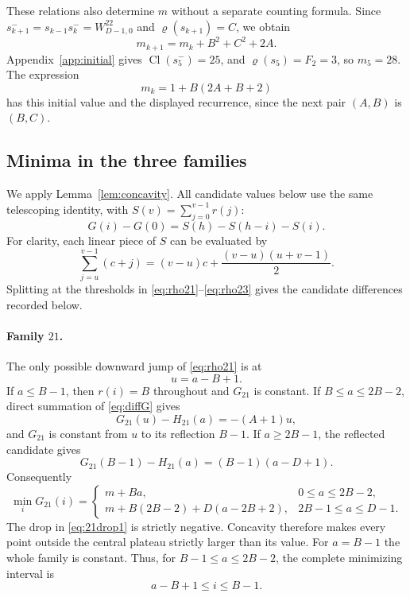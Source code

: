 \documentclass[11pt]{amsart}
\newcommand{\Cl}{\operatorname{Cl}}
\newcommand{\Rho}{\varrho}
\begin{document}
These relations also determine $m$ without a separate counting formula.
Since $s_{k+1}^-=s_{k-1}s_k^-=W^{22}_{D-1,0}$ and
$\Rho(s_{k+1})=C$, we obtain
\[
 m_{k+1}=m_k+B^2+C^2+2A.
\]
Appendix~\ref{app:initial} gives $\Cl(s_5^-)=25$, and
$\Rho(s_5)=F_2=3$, so $m_5=28$.  The expression
\begin{equation}\label{eq:mformula}
 m_k=1+B(2A+B+2)
\end{equation}
has this initial value and the displayed recurrence, since the next
pair $(A,B)$ is $(B,C)$.

\subsection{Minima in the three families}
We apply Lemma~\ref{lem:concavity}.  All candidate values below use the
same telescoping identity, with $S(v)=\sum_{j=0}^{v-1}r(j)$:
\begin{equation}\label{eq:sumG}
 G(i)-G(0)=S(h)-S(h-i)-S(i).
\end{equation}
For clarity, each linear piece of $S$ can be evaluated by
\[
 \sum_{j=u}^{v-1}(c+j)=(v-u)c+\frac{(v-u)(u+v-1)}2.
\]
Splitting at the thresholds in \eqref{eq:rho21}--\eqref{eq:rho23}
gives the candidate differences recorded below.

\paragraph{Family $21$.}
The only possible downward jump of \eqref{eq:rho21} is at
\[
 u=a-B+1.
\]
If $a\le B-1$, then $r(i)=B$ throughout and $G_{21}$ is constant.  If
$B\le a\le2B-2$, direct summation of \eqref{eq:diffG} gives
\begin{equation}\label{eq:21drop1}
 G_{21}(u)-H_{21}(a)=-(A+1)u,
\end{equation}
and $G_{21}$ is constant from $u$ to its reflection $B-1$.  If $a\ge2B-1$, the reflected candidate gives
\begin{equation}\label{eq:21drop2}
 G_{21}(B-1)-H_{21}(a)=(B-1)(a-D+1).
\end{equation}
Consequently
\begin{equation}\label{eq:min21}
\min_iG_{21}(i)=
\begin{cases}
 m+Ba,&0\le a\le2B-2,\\
 m+B(2B-2)+D(a-2B+2),&2B-1\le a\le D-1.
\end{cases}
\end{equation}
The drop in \eqref{eq:21drop1} is strictly negative.  Concavity therefore makes every point outside the central plateau strictly larger than its value.  For $a=B-1$ the whole family is constant.  Thus, for $B-1\le a\le2B-2$, the complete minimizing interval is
\begin{equation}\label{eq:plateau21}
 a-B+1\le i\le B-1.
\end{equation}
\end{document}
